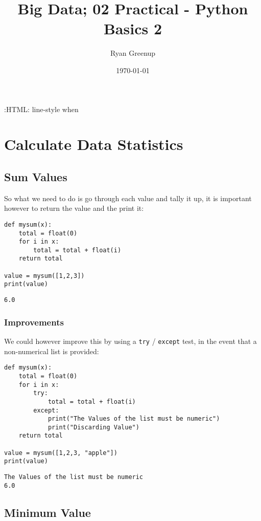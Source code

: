 \documentclass[11pt]{article}
\author{Ryan Greenup}
\date{\today}
\title{Big Data; 02 Practical - Python Basics 2}
\begin{document}
\maketitle
\tableofcontents

:HTML:
line-style when

\section{Calculate Data Statistics}
\label{sec:org2a6c24c}

\subsection{Sum Values}
\label{sec:org5adc63c}
So what we need to do is go through each value and tally it up, it is important
however to return the value and the print it:

\begin{verbatim}
def mysum(x):
    total = float(0)
    for i in x:
        total = total + float(i)
    return total

value = mysum([1,2,3])
print(value)
\end{verbatim}

\begin{verbatim}
6.0
\end{verbatim}

\subsubsection{Improvements}
\label{sec:org6cf3875}

We could however improve this by using a \texttt{try} / \texttt{except} test, in the event
that a non-numerical list is provided:

\begin{verbatim}
def mysum(x):
    total = float(0)
    for i in x:
        try:
            total = total + float(i)
        except:
            print("The Values of the list must be numeric")
            print("Discarding Value")
    return total

value = mysum([1,2,3, "apple"])
print(value)
\end{verbatim}

\begin{verbatim}
The Values of the list must be numeric
6.0
\end{verbatim}
\subsection{Minimum Value}
\label{sec:orgb8571f8}
\end{document}
